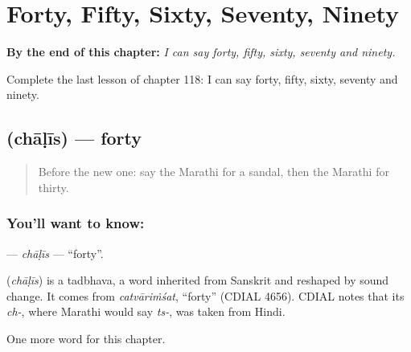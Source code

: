 
\chapter{Forty, Fifty, Sixty, Seventy, Ninety}
\label{ch:mr-forty-fifty-sixty-seventy-ninety}

\begin{chapteropening}
\textbf{By the end of this chapter:} \emph{I can say forty, fifty, sixty, seventy and ninety.}

Complete the last lesson of chapter 118: I can say forty, fifty, sixty, seventy and ninety.
\end{chapteropening}

\section[\texorpdfstring{\mr{चाळीस} (chāḷīs)}{चाळीस (chāḷīs)}]{ (chāḷīs) — forty}

\label{lesson:MR-C118-chalis}



\begin{quote}
Before the new one: say the Marathi for a sandal, then the Marathi for thirty.
\end{quote}

\subsection*{You'll want to know: }
\textbf{} — \emph{chāḷīs} — \textquotedblleft{}forty\textquotedblright{}.

\begin{cousinweb}
\textbf{} (\emph{chāḷīs}) is a tadbhava, a word inherited from Sanskrit and reshaped by sound change. It comes from \emph{catvāriṁśat}, \textquotedblleft{}forty\textquotedblright{} (CDIAL 4656). CDIAL notes that its \emph{ch-}, where Marathi would say \emph{ts-}, was taken from Hindi.
\end{cousinweb}

\begin{grammarlens}[title={What you've built}]
One more word for this chapter.
\end{grammarlens}

